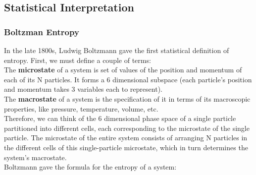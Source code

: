 \documentclass[letterpaper,10pt,english]{article}
\begin{document}
\subsection{Statistical Interpretation}
\subsubsection{Boltzman Entropy}
In the late 1800s, Ludwig Boltzmann gave the first statistical definition of entropy. First, we must define a couple of terms: \\
The \textbf{microstate} of a system is set of values of the position and momentum of each of its N particles. It forms a 6 dimensional subspace (each particle's position and momentum takes 3 variables each to represent). \\
The \textbf{macrostate} of a system is the specification of it in terms of its macroscopic properties, like pressure, temperature, volume, etc. \\
Therefore, we can think of the 6 dimensional phase space of a single particle partitioned into different cells, each corresponding to the microstate of the single particle. The microstate of the entire system consists of arranging N particles in the different cells of this single-particle microstate, which in turn determines the system's macrostate. \\
Boltzmann gave the formula for the entropy of a system:
\end{document}
